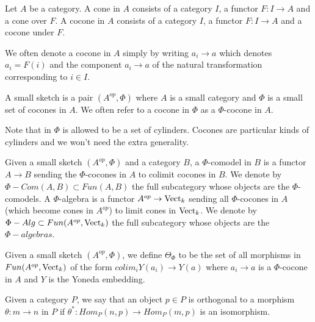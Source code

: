 \begin{definition}

  \noindent Let $A$ be a category. A cone in $A$ consists of a category $I$, a
  functor $F:I\to A$ and a cone over $F$. A cocone in $A$ consists of a
  category $I$, a functor $F:I\to A$ and a cocone under $F$.
\end{definition}

We often denote a cocone in $A$ simply by writing $a_i\to a$ which denotes
$a_i=F(i)$ and the component $a_i\to a$ of the natural transformation
corresponding to $i\in I$.


\begin{definition}

  \noindent A small sketch is a pair $(A^{op},\Phi)$ where $A$ is a small
  category and $\Phi$ is a small set of cocones in $A$. We often refer to a
  cocone in $\Phi$ as a $\Phi$-cocone in $A$.
\end{definition}

\begin{remark}
  Note that in \cite{kelly/basic-concepts-enriched} $\Phi$ is allowed to be a
  set of cylinders. Cocones are particular kinds of cylinders and we won't
  need the extra generality.
\end{remark}

\begin{definition}
  \noindent Given a small sketch $(A^{op},\Phi)$ and a category $B$, a
  $\Phi$-comodel in $B$ is a functor $A\to B$ sending the $\Phi$-cocones in
  $A$ to colimit cocones in $B$. We denote by $\Phi-Com(A,B)\subset Fun(A,B)$
  the full subcategory whose objects are the $\Phi$-comodels. A $\Phi$-algebra
  is a functor $A^{op}\to \operatorname{Vect}_k$ sending all $\Phi$-cocones in $A$ (which
  become cones in $A^{op}$) to limit cones in $\operatorname{Vect}_k$. We denote by
  $\Phi-Alg\subset Fun(A^{op},\operatorname{Vect}_k)$ the full subcategory whose objects are
  the $\Phi-algebras$.
\end{definition}


\begin{definition}

  \noindent Given a small sketch $(A^{op},\Phi)$, we define $\Theta_{\Phi}$ to
  be the set of all morphisms in $Fun(A^{op},\operatorname{Vect}_k)$ of the form $colim_i
  Y(a_i)\to Y(a)$ where $a_i\to a$ is a $\Phi$-cocone in $A$ and $Y$ is the
  Yoneda embedding.
\end{definition}

\begin{definition}

  \noindent Given a category $P$, we say that an object $p\in P$ is orthogonal
  to a morphism $\theta:m\to n$ in $P$ if $\theta^*:Hom_P(n,p)\to Hom_P(m,p)$
  is an isomorphism.
\end{definition}

